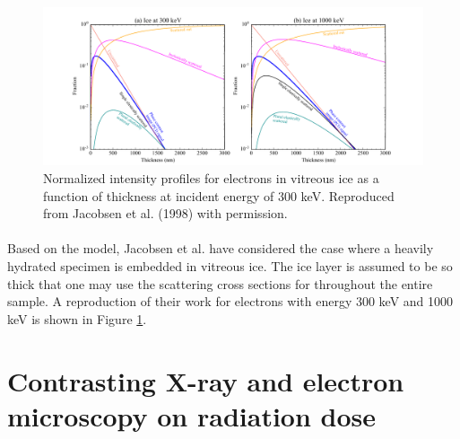\documentclass[]{article}
\begin{document}
\begin{figure}[b!]
\begin{center}
\includegraphics[scale=0.6]{unimatrix_fig_e.pdf}
\caption{Normalized intensity profiles for electrons in vitreous ice as a function of thickness at incident energy of 300 keV. Reproduced from Jacobsen et al. (1998) with permission.}
\label{fig:ice_e_cate}
\end{center}
\end{figure}

\paragraph{} Based on the model, Jacobsen et al. \cite{Jacobsen:1998vj} have considered the case where a heavily hydrated specimen is embedded in vitreous ice. The ice layer is assumed to be so thick that one may use the scattering cross sections for  throughout the entire sample. A reproduction of their work for electrons with energy 300 keV and 1000 keV is shown in Figure \ref{fig:ice_e_cate}. 

\section{Contrasting X-ray and electron microscopy on radiation dose}
\end{document}

